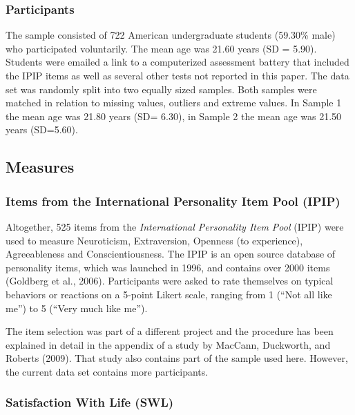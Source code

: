 \documentclass[,man,floatsintext]{apa6}
\theoremstyle{definition}
\theoremstyle{definition}
\theoremstyle{definition}
\theoremstyle{remark}
\begin{document}
\hypertarget{participants}{%
\subsubsection{Participants}\label{participants}}

The sample consisted of 722 American undergraduate students (59.30\%
male) who participated voluntarily. The mean age was 21.60 years (SD =
5.90). Students were emailed a link to a computerized assessment battery
that included the IPIP items as well as several other tests not reported
in this paper. The data set was randomly split into two equally sized
samples. Both samples were matched in relation to missing values,
outliers and extreme values. In Sample 1 the mean age was 21.80 years
(SD= 6.30), in Sample 2 the mean age was 21.50 years (SD=5.60).

\hypertarget{measures}{%
\subsection{Measures}\label{measures}}

\hypertarget{items-from-the-international-personality-item-pool-ipip}{%
\subsubsection{Items from the International Personality Item Pool
(IPIP)}\label{items-from-the-international-personality-item-pool-ipip}}

Altogether, 525 items from the \emph{International Personality Item
Pool} (IPIP) were used to measure Neuroticism, Extraversion, Openness
(to experience), Agreeableness and Conscientiousness. The IPIP is an
open source database of personality items, which was launched in 1996,
and contains over 2000 items (Goldberg et al., 2006). Participants were
asked to rate themselves on typical behaviors or reactions on a 5-point
Likert scale, ranging from 1 (\enquote{Not all like me}) to 5
(\enquote{Very much like me}).

The item selection was part of a different project and the procedure has
been explained in detail in the appendix of a study by MacCann,
Duckworth, and Roberts (2009). That study also contains part of the
sample used here. However, the current data set contains more
participants.

\hypertarget{satisfaction-with-life-swl}{%
\subsubsection{Satisfaction With Life
(SWL)}\label{satisfaction-with-life-swl}}
\end{document}
